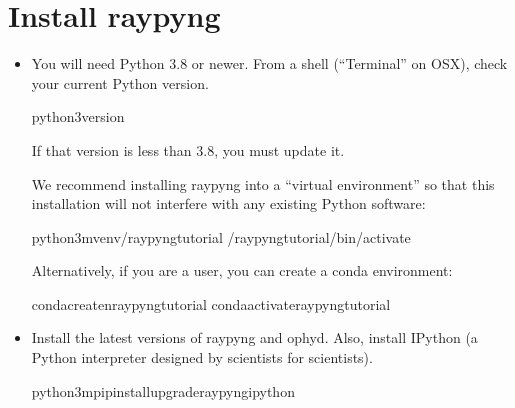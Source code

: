 \documentclass[letterpaper,10pt,english]{sphinxmanual}
\begin{document}
\section{Install raypyng}
\label{\detokenize{installation:install-raypyng}}\begin{itemize}
\item {} 
\sphinxAtStartPar
You will need Python 3.8 or newer. From a shell (“Terminal” on OSX),
check your current Python version.

\begin{sphinxVerbatim}[commandchars=\\\{\}]
python3\PYGZhy{}\PYGZhy{}version
\end{sphinxVerbatim}

\sphinxAtStartPar
If that version is less than 3.8, you must update it.

\sphinxAtStartPar
We recommend installing raypyng into a “virtual environment” so that this
installation will not interfere with any existing Python software:

\begin{sphinxVerbatim}[commandchars=\\\{\}]
python3\PYGZhy{}mvenv\PYGZti{}/raypyng\PYGZhy{}tutorial
\PYGZti{}/raypyng\PYGZhy{}tutorial/bin/activate
\end{sphinxVerbatim}

\sphinxAtStartPar
Alternatively, if you are a
 user,
you can create a conda environment:

\begin{sphinxVerbatim}[commandchars=\\\{\}]
condacreate\PYGZhy{}nraypyng\PYGZhy{}tutorial
condaactivateraypyng\PYGZhy{}tutorial
\end{sphinxVerbatim}

\item {} 
\sphinxAtStartPar
Install the latest versions of raypyng and ophyd. Also, install IPython
(a Python interpreter designed by scientists for scientists).

\begin{sphinxVerbatim}[commandchars=\\\{\}]
python3\PYGZhy{}mpipinstall\PYGZhy{}\PYGZhy{}upgraderaypyngipython
\end{sphinxVerbatim}


\end{itemize}
\end{document}
